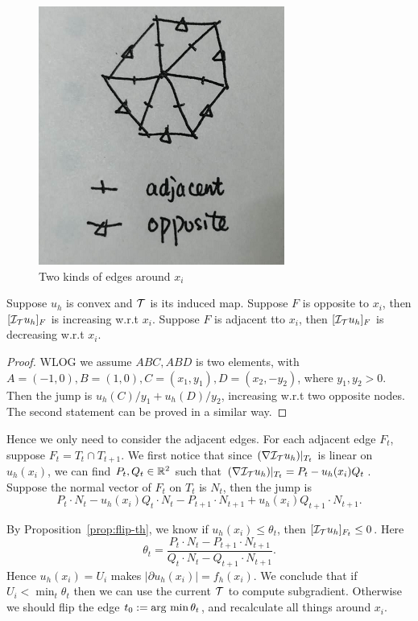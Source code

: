 \documentclass{article}
\begin{document}
\begin{figure}[H]
	
	
	\centering
	\includegraphics[scale=0.3]{../fig/adjopp.png}
	\caption{Two kinds of edges around $x_i$}
	\label{fig:adjopp}
\end{figure}
\begin{proposition}
	\label{prop:flip-th}
	Suppose $u_h$ is convex and $\mathcal T$ is its induced map. Suppose $F$ is opposite to $x_i$, then $[\mathcal I_{\mathcal T}u_h]_F$ is increasing w.r.t $x_i$. Suppose $F$ is adjacent tto $x_i$, then $[\mathcal I_{\mathcal T}u_h]_F$ is decreasing w.r.t $x_i$.
\end{proposition}
\begin{proof}
	WLOG we assume $ABC,ABD$ is two elements, with $A=(-1,0), B = (1,0), C = (x_1,y_1), D = (x_2, -y_2)$, where $y_1, y_2 > 0$. Then the jump is $u_h(C)/y_1 + u_h(D)/y_2$, increasing w.r.t two opposite nodes. The second statement can be proved in a similar way.
\end{proof}

Hence we only need to consider the adjacent edges. For each adjacent edge $F_t$, suppose $F_t = T_{t} \cap T_{t+1}$. We first notice that since $(\nabla \mathcal I_{\mathcal T}u_h)|_{T_{t}}$ is linear on $u_h(x_i)$, we can find $P_t, Q_t \in \mathbb R^2$ such that $(\nabla \mathcal I_{\mathcal T}u_h)|_{T_{t}} = P_t - u_h(x_i)Q_t$. Suppose the normal vector of $F_t$ on $T_t$ is $N_t$, then the jump is 
$$P_t\cdot N_t- u_h(x_i)Q_t\cdot N_t - P_{t+1}\cdot N_{t+1} + u_h(x_i)Q_{t+1}\cdot N_{t+1}.$$ 

By Proposition~\ref{prop:flip-th}, we know if $u_h(x_i) \le \theta_t$, then $[\mathcal I_{\mathcal T}u_h]_{F_t} \le 0$. Here 
\begin{equation}
\label{eq:th}
\theta_t = \frac{P_t\cdot N_t - P_{t+1}\cdot N_{t+1}}{Q_t\cdot N_t -Q_{t+1}\cdot N_{t+1} }.
\end{equation}
Hence $u_h(x_i) = U_i$ makes $|\partial u_h(x_i)| = f_h(x_i)$. We conclude that if $U_i < \min_t \theta_t$ then we can use the current $\mathcal T$ to compute subgradient. Otherwise we should flip the edge $t_0 := \operatorname{arg~min} \theta_t$, and recalculate all things around $x_i$. 
\end{document}
